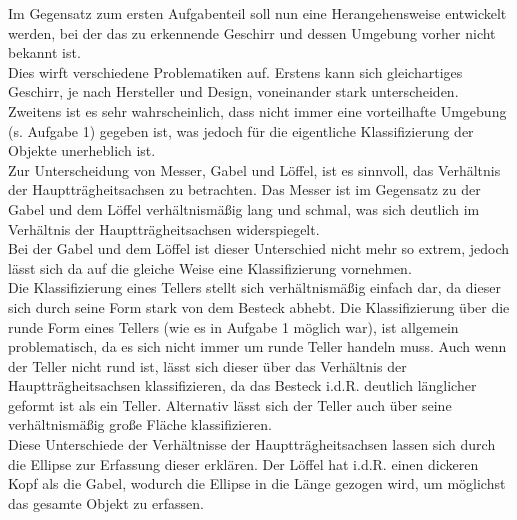 \documentclass{ezb}
\begin{document}
Im Gegensatz zum ersten Aufgabenteil soll nun eine Herangehensweise entwickelt werden, bei der das zu erkennende Geschirr und dessen Umgebung vorher nicht bekannt ist.\\
Dies wirft verschiedene Problematiken auf. Erstens kann sich gleichartiges Geschirr, je nach Hersteller und Design, voneinander stark unterscheiden.
Zweitens ist es sehr wahrscheinlich, dass nicht immer eine vorteilhafte Umgebung (s. Aufgabe 1) gegeben ist, was jedoch für die eigentliche Klassifizierung der Objekte unerheblich ist.\\
Zur Unterscheidung von Messer, Gabel und Löffel, ist es sinnvoll, das Verhältnis der Hauptträgheitsachsen zu betrachten. Das Messer ist im Gegensatz zu der Gabel und dem Löffel verhältnismäßig lang und schmal, was sich deutlich im Verhältnis der Hauptträgheitsachsen widerspiegelt.\\
Bei der Gabel und dem Löffel ist dieser Unterschied nicht mehr so extrem, jedoch lässt sich da auf die gleiche Weise eine Klassifizierung vornehmen.\\
Die Klassifizierung eines Tellers stellt sich verhältnismäßig einfach dar, da dieser sich durch seine Form stark von dem Besteck abhebt. Die Klassifizierung über die runde Form eines Tellers (wie es in Aufgabe 1 möglich war), ist allgemein problematisch, da es sich nicht immer um runde Teller handeln muss. Auch wenn der Teller nicht rund ist, lässt sich dieser über das Verhältnis der Hauptträgheitsachsen klassifizieren, da das Besteck i.d.R. deutlich länglicher geformt ist als ein Teller. Alternativ lässt sich der Teller auch über seine verhältnismäßig große Fläche klassifizieren.\\
Diese Unterschiede der Verhältnisse der Hauptträgheitsachsen lassen sich durch die Ellipse zur Erfassung dieser erklären. Der Löffel hat i.d.R. einen dickeren Kopf als die Gabel, wodurch die Ellipse in die Länge gezogen wird, um möglichst das gesamte Objekt zu erfassen.

\end{document}
